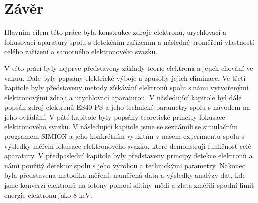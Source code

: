 \newpage
\chapter*{Závěr} %

Hlavním cílem této práce byla konstrukce zdroje elektronů, urychlovací a fokusovací aparatury spolu s detekčním zařízením a následné proměření vlastností celého zařízení a samotného elektronového svazku. 

V této práci byly nejprve představeny základy teorie elektronů a jejich chování ve vakuu. Dále byly popsány elektrické výboje a způsoby jejich eliminace. Ve třetí kapitole byly představeny metody získávání elektronů spolu s námi vytvořenými elektronovými zdroji a urychlovací aparaturou. V následující kapitole byl dále popsán zdroj elektronů ES40-PS a jeho technické parametry spolu s návodem na jeho ovládání. V páté kapitole byly popsány teoretické principy fokusace elektronového svazku. V následující kapitole jsme se seznámili se simulačním programem SIMION a jeho konkrétním využitím v našem experimentu spolu s výsledky měření fokusace elektronového svazku, které demonstrují funkčnost celé aparatury. V předposlední kapitole byly představeny principy detekce elektronů a námi použitý detektor spolu s jeho výrobou a technickými parametry. Nakonec byla představena metodika měření, naměřená data a výsledky analýzy dat, kde jsme konverzí elektronů na fotony pomocí slitiny mědi a zlata změřili spodní limit energie elektronů jako 8 keV.

